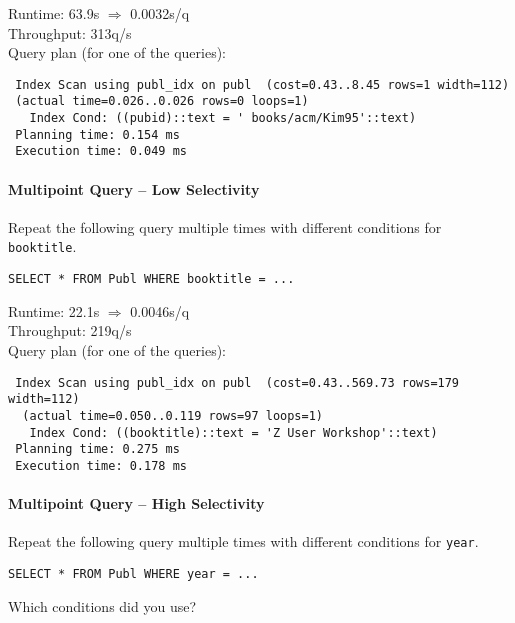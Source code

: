 \documentclass[11pt]{scrartcl}
\begin{document}
\smallskip\noindent
Runtime: 63.9s $\Rightarrow$ 0.0032s/q\\
Throughput: 313q/s\\

\smallskip\noindent
Query plan (for one of the queries):
{\small
\begin{verbatim}
 Index Scan using publ_idx on publ  (cost=0.43..8.45 rows=1 width=112)
 (actual time=0.026..0.026 rows=0 loops=1)
   Index Cond: ((pubid)::text = ' books/acm/Kim95'::text)
 Planning time: 0.154 ms
 Execution time: 0.049 ms
\end{verbatim}
}


\paragraph{Multipoint Query -- Low Selectivity}

Repeat the following query multiple times with different conditions for {\tt booktitle}.

{\small
\begin{verbatim}
SELECT * FROM Publ WHERE booktitle = ...
\end{verbatim}
}

\noindent
\condB

\smallskip\noindent
Runtime: 22.1s $\Rightarrow$ 0.0046s/q\\
Throughput: 219q/s\\

\smallskip\noindent
Query plan (for one of the queries):
{\small
\begin{verbatim}
 Index Scan using publ_idx on publ  (cost=0.43..569.73 rows=179 width=112)
  (actual time=0.050..0.119 rows=97 loops=1)
   Index Cond: ((booktitle)::text = 'Z User Workshop'::text)
 Planning time: 0.275 ms
 Execution time: 0.178 ms
\end{verbatim}
}


\paragraph{Multipoint Query -- High Selectivity}

Repeat the following query multiple times with different conditions for {\tt year}.

{\small
\begin{verbatim}
SELECT * FROM Publ WHERE year = ...
\end{verbatim}
}

\noindent
Which conditions did you use?\\
\condC
\end{document}
